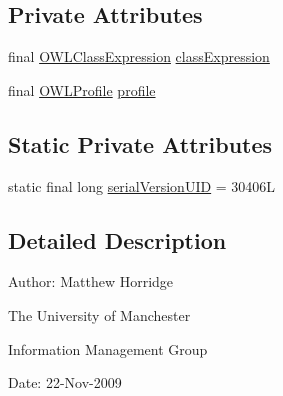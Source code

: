 \subsection*{Private Attributes}
\begin{DoxyCompactItemize}
\item 
final \hyperlink{interfaceorg_1_1semanticweb_1_1owlapi_1_1model_1_1_o_w_l_class_expression}{O\-W\-L\-Class\-Expression} \hyperlink{classorg_1_1semanticweb_1_1owlapi_1_1reasoner_1_1_class_expression_not_in_profile_exception_a5305eb3833162f7e0f008b0050731cf6}{class\-Expression}
\item 
final \hyperlink{interfaceorg_1_1semanticweb_1_1owlapi_1_1profiles_1_1_o_w_l_profile}{O\-W\-L\-Profile} \hyperlink{classorg_1_1semanticweb_1_1owlapi_1_1reasoner_1_1_class_expression_not_in_profile_exception_afd11ad29c663e65803aec4c859d322aa}{profile}
\end{DoxyCompactItemize}
\subsection*{Static Private Attributes}
\begin{DoxyCompactItemize}
\item 
static final long \hyperlink{classorg_1_1semanticweb_1_1owlapi_1_1reasoner_1_1_class_expression_not_in_profile_exception_a6cc1037ef2c2a17eda4a181cb93c2141}{serial\-Version\-U\-I\-D} = 30406\-L
\end{DoxyCompactItemize}


\subsection{Detailed Description}
Author\-: Matthew Horridge\par
 The University of Manchester\par
 Information Management Group\par
 Date\-: 22-\/\-Nov-\/2009 

